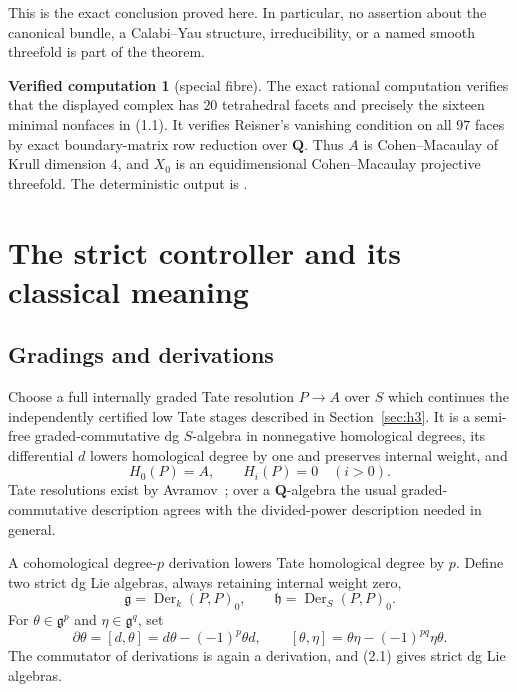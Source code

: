\documentclass[11pt]{article}
\theoremstyle{definition}
\newtheorem{computation}[theorem]{Verified computation}
\theoremstyle{remark}
\newcommand{\QQ}{\mathbf Q}
\newcommand{\Der}{\operatorname{Der}}
\begin{document}
This is the exact conclusion proved here.  In particular, no assertion about
the canonical bundle, a Calabi--Yau structure, irreducibility, or a named
smooth threefold is part of the theorem.

\begin{computation}[special fibre]\label{comp:special}
The exact rational computation
 verifies that the
displayed complex has $20$ tetrahedral facets and precisely the sixteen
minimal nonfaces in (1.1).  It verifies Reisner's vanishing condition on all
$97$ faces by exact boundary-matrix row reduction over $\QQ$.  Thus $A$ is
Cohen--Macaulay of Krull dimension $4$, and $X_0$ is an equidimensional
Cohen--Macaulay projective threefold.  The deterministic output is
.
\end{computation}

\section{The strict controller and its classical meaning}

\subsection{Gradings and derivations}

Choose a full internally graded Tate resolution $P\to A$ over $S$ which
continues the independently certified low Tate stages described in
Section~\ref{sec:h3}.  It is a
semi-free graded-commutative dg $S$-algebra in nonnegative homological
degrees, its differential $d$ lowers homological degree by one and preserves
internal weight, and
\[
 H_0(P)=A,\qquad H_i(P)=0\quad(i>0).
\]
Tate resolutions exist by Avramov~\cite[Proposition 6.1.4]{Avramov}; over a
$\QQ$-algebra the usual graded-commutative description agrees with the
divided-power description needed in general.

A cohomological degree-$p$ derivation lowers Tate homological degree by $p$.
Define two strict dg Lie algebras, always retaining internal weight zero,
\[
 \mathfrak g=\Der_k(P,P)_0,
 \qquad
 \mathfrak h=\Der_S(P,P)_0.
\]
For $\theta\in\mathfrak g^p$ and $\eta\in\mathfrak g^q$, set
\[
 \partial\theta=[d,\theta]
   =d\theta-(-1)^p\theta d,
 \qquad
 [\theta,\eta]=\theta\eta-(-1)^{pq}\eta\theta.              \tag{2.1}
\]
The commutator of derivations is again a derivation, and (2.1) gives strict
dg Lie algebras.
\end{document}
